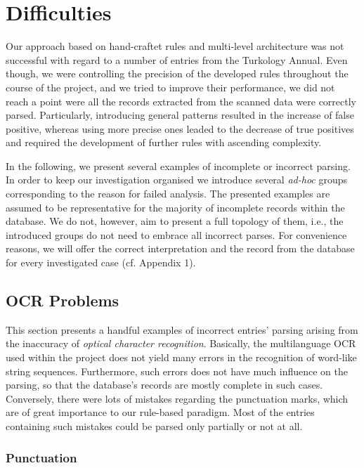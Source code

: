 \documentclass{scrartcl}
\begin{document}
\section{Difficulties}
Our approach based on hand-craftet rules and multi-level architecture was not 
successful with regard to a number of entries from the Turkology
Annual. Even though, we were controlling the precision of the developed rules
throughout the course of the project, and we tried to improve their performance,
we did not reach a point were all the records extracted from the scanned data
were correctly parsed. Particularly, introducing general patterns
resulted in the increase of false positive, whereas using more precise ones
leaded to the decrease of true positives and required the development of further
rules with ascending complexity. 

In the following, we present several examples of incomplete or incorrect parsing.
In order to keep our investigation organised we introduce several \emph{ad-hoc}
groups corresponding to the reason for failed analysis. The presented examples
are assumed to be representative for the majority of incomplete records within
the database. We do not, however, aim to present a full topology of them, i.e.,
the introduced groups do not need to embrace all incorrect parses. For
convenience reasons, we will offer the correct interpretation and the record
from the database for every investigated case (cf. Appendix 1).

\subsection{OCR Problems}
This section presents a handful examples of incorrect entries' parsing arising
from the inaccuracy of \emph{optical character recognition}. Basically, the
multilanguage OCR used within the project does not yield many errors in the
recognition of word-like string sequences. Furthermore, such errors does not
have much influence on the parsing, so that the database's records are mostly
complete in such cases. Conversely, there were lots of mistakes regarding the
punctuation marks, which are of great importance to our rule-based paradigm.
Most of the entries containing such mistakes could be parsed only partially or
not at all. 

\subsubsection{Punctuation}
\end{document}
